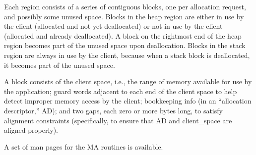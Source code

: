 Each region consists of a series of contiguous blocks, one per
allocation request, and possibly some unused space.  Blocks in
the heap region are either in use by the client (allocated and
not yet deallocated) or not in use by the client (allocated and
already deallocated).  A block on the rightmost end of the heap
region becomes part of the unused space upon deallocation.
Blocks in the stack region are always in use by the client,
because when a stack block is deallocated, it becomes part of
the unused space.

A block consists of the client space, i.e., the range of memory
available for use by the application; guard words adjacent to
each end of the client space to help detect improper memory access
by the client; bookkeeping info (in an ``allocation descriptor,''
AD); and two gaps, each zero or more bytes long, to satisfy
alignment constraints (specifically, to ensure that AD and
client\_space are aligned properly).

A set of man pages for the MA routines is available.

